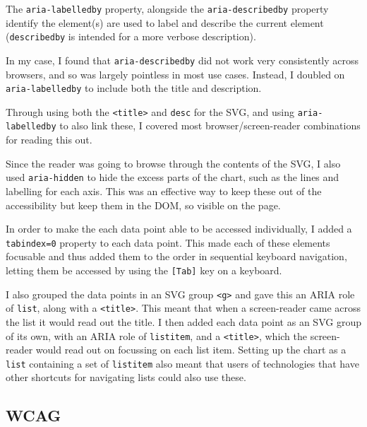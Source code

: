\documentclass[ %
                    author={Aleena Baig},
                supervisor={Dr Simon Lock},
                    degree={BSc},
                     title={On Making Web Accessible Graphs},
                  subtitle={},
                      year={2019} ]{dissertation}
\begin{document}
The \texttt{aria-labelledby} property, alongside the \texttt{aria-describedby} property identify the element(s) are used to label and describe the current element (\texttt{describedby} is intended for a more verbose description).

In my case, I found that \texttt{aria-describedby} did not work very consistently across browsers, and so was largely pointless in most use cases. Instead, I doubled on \texttt{aria-labelledby} to include both the title and description.

Through using both the \texttt{<title>} and \texttt{desc} for the SVG, and using \texttt{aria-labelledby} to also link these, I covered most browser/screen-reader combinations for reading this out.

Since the reader was going to browse through the contents of the SVG, I also used \texttt{aria-hidden} to hide the excess parts of the chart, such as the lines and labelling for each axis. This was an effective way to keep these out of the accessibility but keep them in the DOM, so visible on the page.


In order to make the each data point able to be accessed individually, I added a \texttt{tabindex=0} property to each data point. This made each of these elements focusable and thus added them to the order in sequential keyboard navigation, letting them be accessed by using the \texttt{[Tab]} key on a keyboard.

I also grouped the data points in an SVG group \texttt{<g>} and gave this an ARIA role of \texttt{list}, along with a \texttt{<title>}. This meant that when a screen-reader came across the list it would read out the title. I then added each data point as an SVG group of its own, with an ARIA role of \texttt{listitem}, and a \texttt{<title>}, which the screen-reader would read out on focussing on each list item. Setting up the chart as a \texttt{list} containing a set of \texttt{listitem} also meant that users of technologies that have other shortcuts for navigating lists could also use these.


\subsection{WCAG}
\end{document}
